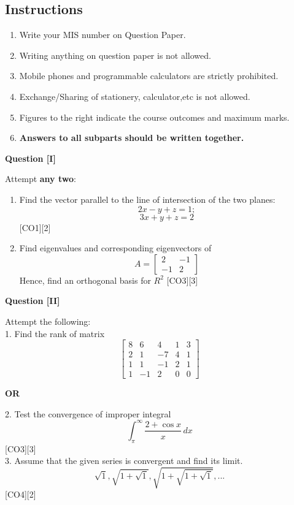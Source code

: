 \documentclass[12pt]{article}
\begin{document}
\subsection{Instructions}
\begin{enumerate}
\item Write your MIS number on Question Paper.
\item Writing anything on question paper is not allowed.
\item Mobile phones and programmable calculators are strictly prohibited.
\item Exchange/Sharing of stationery, calculator,etc is not allowed.
\item Figures to the right indicate the course outcomes and maximum marks.
\item\textbf{Answers to all subparts should be written together.}
\end{enumerate}
\newpage
\begin{flushleft}
\large\textbf{Question [I]}
\end{flushleft}
Attempt \textbf{any two}:
\begin{enumerate}
\item Find the vector parallel to the line of intersection of the two planes: $$2x-y+z=1;$$ $$3x+y+z=2$$ \hfill [CO1][2]
\item Find eigenvalues and corresponding eigenvectors of  $$ A= \begin{bmatrix}
2 & -1 \\
-1 & 2 
\end{bmatrix} $$
Hence, find an orthogonal basis for $R^{2}$ \hfill [CO3][3]
\end{enumerate}
\vspace{1cm}
\begin{flushleft}
\large\textbf{Question [II]}
\end{flushleft}
Attempt the following:
\\1. Find the rank of matrix 
$$ \begin{bmatrix}
8 & 6 & 4 & 1 & 3 \\
2 & 1 & -7 & 4 & 1 \\
1 & 1 & -1 & 2 & 1 \\
1 & -1 & 2 & 0 & 0 
\end{bmatrix} $$
\begin{center}
\textbf{OR}
\end{center}
2. Test the convergence of improper integral $$ \int_{\pi}^{\infty}     \frac{2+\cos x}{x} \, dx $$ \hfill [CO3][3]
\\3. Assume that the given series is convergent and find its limit. $$\sqrt{1},\sqrt{1+\sqrt{1}},\sqrt{1+\sqrt{1+\sqrt{1}}},...$$ \hfill [CO4][2]
\end{document}
